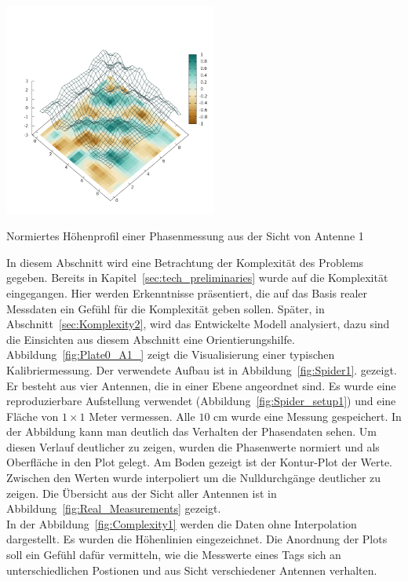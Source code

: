 %
\begin{floatingfigure}[hr!]{6cm}
 \centering
         \includegraphics[width=7cm]{img/Plate0_A1.png}
         \caption[Profil einer Phasenmessung]{Normiertes Höhen\-pro\-fil einer Phasen\-mes\-sung aus der Sicht von Anten\-ne 1 }
         \label{fig:Plate0_A1_}
\end{floatingfigure}
%
In diesem Abschnitt wird eine Betrachtung der Komplexität des Problems gegeben. Bereits in Kapitel~\ref{sec:tech_preliminaries} wurde auf die Komplexität eingegangen. Hier werden Erkenntnisse präsentiert, die auf das Basis realer Messdaten ein Gefühl für die Komplexität geben sollen. Später, in Abschnitt~\ref{sec:Komplexity2}, wird das Entwickelte Modell analysiert, dazu sind die Einsichten aus diesem Abschnitt eine Orientierungshilfe.\\
%

Abbildung~\ref{fig:Plate0_A1_} zeigt die Visualisierung einer typischen Kalibriermessung. Der verwendete Aufbau ist in Abbildung~\ref{fig:Spider1}. gezeigt. Er besteht aus vier Antennen, die in einer Ebene angeordnet sind. Es wurde eine reproduzierbare Aufstellung verwendet (Abbildung~\ref{fig:Spider_setup1}) und eine Fläche von $1\times1$ Meter vermessen. Alle $10$ cm wurde eine Messung gespeichert. In der Abbildung kann man deutlich das Verhalten der Phasendaten sehen. Um diesen Verlauf deutlicher zu zeigen, wurden die Phasenwerte normiert und als Oberfläche in den Plot gelegt. Am Boden gezeigt ist der Kontur-Plot der Werte. Zwischen den Werten wurde interpoliert um die Nulldurchgänge deutlicher zu zeigen. Die Übersicht aus der Sicht aller Antennen ist in Abbildung~\ref{fig:Real_Measurements} gezeigt.\\
%

In der Abbildung~\ref{fig:Complexity1} werden die Daten ohne Interpolation dargestellt. Es wurden die Höhenlinien eingezeichnet. Die Anordnung der Plots soll ein Gefühl dafür vermitteln, wie die Messwerte eines Tags sich an unterschiedlichen Postionen und aus Sicht verschiedener Antennen verhalten.\\
%


